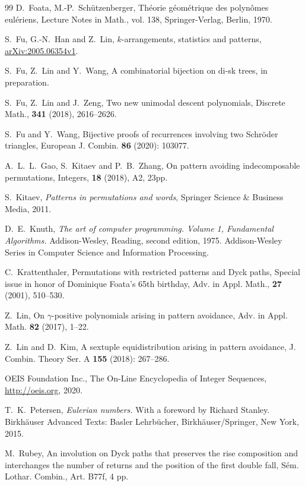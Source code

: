 \documentclass[12pt]{amsart}
\numberwithin{equation}{section}
\theoremstyle{plain}
\theoremstyle{definition}
\begin{document}
\begin{thebibliography}{99}
 D.~Foata, M.-P.~Sch\"utzenberger, Th\'eorie g\'eom\'etrique des polyn\^omes eul\'eriens, Lecture Notes in
Math., vol. 138, Springer-Verlag, Berlin, 1970.

 S.~Fu, G.-N.~Han and Z.~Lin, $k$-arrangements, statistics and patterns, \href{https://arxiv.org/abs/2005.06354}{arXiv:2005.06354v1}.

 S.~Fu, Z.~Lin and Y.~Wang, A combinatorial bijection on di-sk trees, in preparation.

 S.~Fu, Z.~Lin and J.~Zeng, Two new unimodal descent polynomials, Discrete Math., {\bf341} (2018),  2616--2626.

 S.~Fu and Y.~Wang, Bijective proofs of recurrences involving two Schr\"oder triangles, European J. Combin. {\bf86} (2020): 103077.

 A.~L.~L.~Gao, S.~Kitaev and P.~B.~Zhang, On pattern avoiding indecomposable permutations, Integers, {\bf18} (2018), A2, 23pp.

 S.~Kitaev, {\em Patterns in permutations and words}, Springer Science \& Business Media, 2011. 

 D.~E.~Knuth, {\em The art of computer programming. Volume 1, Fundamental Algorithms.} Addison-Wesley, Reading, second edition, 1975. Addison-Wesley Series in Computer Science and Information Processing.

 C.~Krattenthaler, Permutations with restricted patterns and Dyck paths, 
Special issue in honor of Dominique Foata's 65th birthday, 
Adv. in Appl. Math., {\bf27} (2001), 510--530.

 Z.~Lin, On $\gamma$-positive polynomials arising in pattern avoidance, Adv. in Appl. Math. {\bf82} (2017), 1--22.

 Z.~Lin and D.~Kim, A sextuple equidistribution arising in pattern avoidance, J. Combin. Theory Ser. A {\bf 155} (2018): 267--286.

 OEIS Foundation Inc., The On-Line Encyclopedia of Integer Sequences,  \href{http://oeis.org}{http://oeis.org}, 2020.

 T.~K.~Petersen, {\em Eulerian numbers.} With a foreword by Richard Stanley. Birkh\"auser Advanced Texts: Basler Lehrb\"ucher, Birkh\"auser/Springer, New York, 2015.

 M.~Rubey, An involution on Dyck paths that preserves the rise composition and interchanges the number of returns and the position of the first double fall,
S\'em. Lothar. Combin., Art. B77f, 4 pp.


\end{thebibliography}
\end{document}

